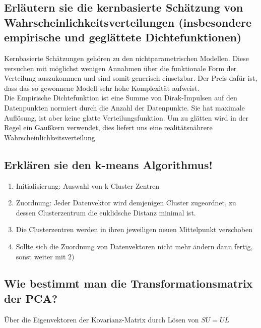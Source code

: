 \documentclass[12pt]{scrartcl}
\begin{document}
\subsection{Erläutern sie die kernbasierte Schätzung von Wahrscheinlichkeitsverteilungen (insbesondere empirische und geglättete Dichtefunktionen)}
Kernbasierte Schätzungen gehören zu den nichtparametrischen Modellen. Diese versuchen mit möglichst wenigen Annahmen über die funktionale Form der Verteilung auszukommen und sind somit generisch einsetzbar. Der Preis dafür ist, dass das so gewonnene Modell sehr hohe Komplexität aufweist. \\
Die Empirische Dichtefunktion ist eine Summe von Dirak-Impulsen auf den Datenpunkten normiert durch die Anzahl der Datenpunkte. Sie hat maximale Auflösung, ist aber keine glatte Verteilungsfunktion. Um zu glätten wird in der Regel ein Gaußkern verwendet, dies liefert uns eine realitätsnährere Wahrscheinlichkeitsverteilung.

\subsection{Erklären sie den k-means Algorithmus!}
\begin{enumerate}
\item Initialisierung: Auswahl von k Cluster Zentren
\item Zuordnung: Jeder Datenvektor wird demjenigen Cluster zugeordnet, zu dessen Clusterzentrum die euklidsche Distanz minimal ist.
\item Die Clusterzentren werden in ihren jeweiligen neuen Mittelpunkt verschoben
\item Sollte sich die Zuordnung von Datenvektoren nicht mehr ändern dann fertig, sonst weiter mit $2)$
\end{enumerate}

\subsection{Wie bestimmt man die Transformationsmatrix der PCA?}
Über die Eigenvektoren der Kovarianz-Matrix durch Lösen von $SU=UL$
\end{document}
